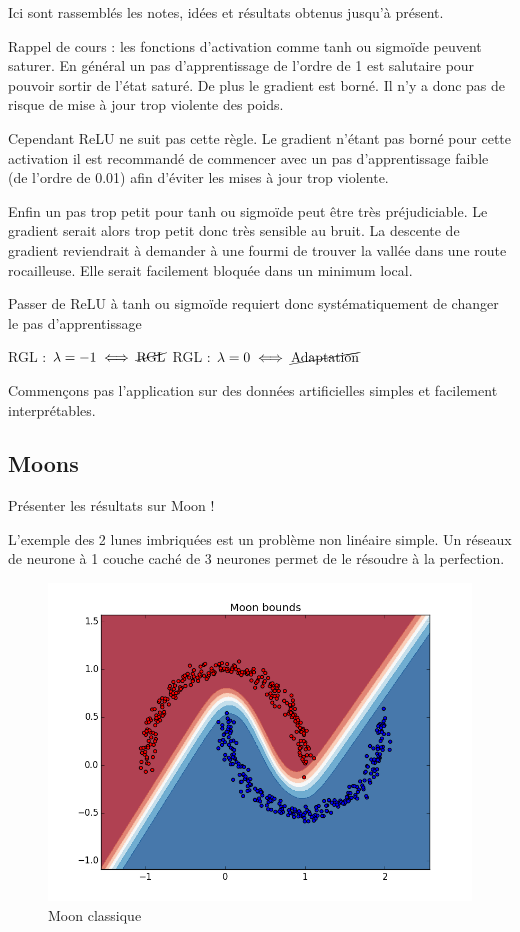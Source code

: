 
Ici sont rassemblés les notes, idées et résultats obtenus jusqu'à présent.

Rappel de cours : les fonctions d'activation comme tanh ou sigmoïde peuvent 
saturer. En général un pas d'apprentissage de l'ordre de 1 est salutaire pour 
pouvoir sortir de l'état saturé. De plus le gradient est borné. Il n'y a donc 
pas de risque de mise à jour trop violente des poids.

Cependant ReLU ne suit pas cette règle. Le gradient n'étant pas borné pour 
cette activation il est recommandé de commencer avec un pas d'apprentissage
faible (de l'ordre de 0.01) afin d'éviter les mises à jour trop violente.

Enfin un pas trop petit pour tanh ou sigmoïde peut être très préjudiciable.
Le gradient serait alors trop petit donc très sensible au bruit.
La descente de gradient reviendrait à demander à une fourmi de trouver la 
vallée dans une route rocailleuse. Elle serait facilement bloquée dans un
minimum local.

Passer de ReLU à tanh ou sigmoïde requiert donc systématiquement de changer 
le pas d'apprentissage


\TODO RGL : $\lambda = -1 \iff \cancel{\text{RGL}}$ 
\TODO RGL : $\lambda = 0 \iff \cancel{\text{Adaptation}}$ 


Commençons pas l'application sur des données artificielles simples et 
facilement interprétables.

\subsection{Moons} %
\label{sub:moons}
\TODO Présenter les résultats sur Moon !

L'exemple des 2 lunes imbriquées est un problème non linéaire simple. Un
réseaux de neurone à 1 couche caché de 3 neurones permet de le résoudre
à la perfection.

\begin{figure}[htbp]
\centering
\includegraphics[width=\columnwidth]{fig/moon-bound-0.png}
\caption{Moon classique}
\end{figure}

